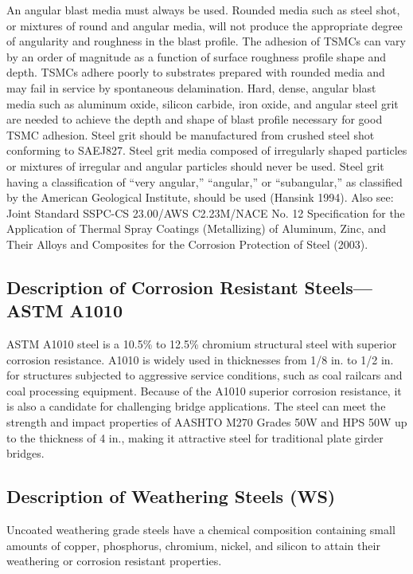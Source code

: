An angular blast media must always be used. Rounded media such as steel shot, or mixtures of round and
angular media, will not produce the appropriate degree of angularity and roughness in the blast profile. The adhesion of TSMCs can vary by an order of magnitude as a function of surface roughness profile shape and depth. TSMCs
adhere poorly to substrates prepared with rounded media and may fail in service by spontaneous delamination. Hard,
dense, angular blast media such as aluminum oxide, silicon carbide, iron oxide, and angular steel grit are needed to
achieve the depth and shape of blast profile necessary for good TSMC adhesion. Steel grit should be manufactured
from crushed steel shot conforming to SAEJ827. Steel grit media composed of irregularly shaped particles or
mixtures of irregular and angular particles should never be used. Steel grit having a classification of “very angular,”
“angular,” or “subangular,” as classified by the American Geological Institute, should be used (Hansink 1994). Also
see: Joint Standard SSPC-CS 23.00/AWS C2.23M/NACE No. 12 Specification for the Application of Thermal Spray
Coatings (Metallizing) of Aluminum, Zinc, and Their Alloys and Composites for the Corrosion Protection of Steel
(2003).

\subsection{Description of Corrosion Resistant Steels—ASTM A1010}
ASTM A1010 steel is a 10.5\% to 12.5\% chromium structural steel with superior corrosion resistance. A1010 is
widely used in thicknesses from 1/8 in. to 1/2 in. for structures subjected to aggressive service conditions, such as
coal railcars and coal processing equipment. Because of the A1010 superior corrosion resistance, it is also a
candidate for challenging bridge applications. The steel can meet the strength and impact properties of AASHTO
M270 Grades 50W and HPS 50W up to the thickness of 4 in., making it attractive steel for traditional plate girder
bridges.

\subsection{Description of Weathering Steels (WS)}

Uncoated weathering grade steels have a chemical composition containing small amounts of copper, phosphorus,
chromium, nickel, and silicon to attain their weathering or corrosion resistant properties.

